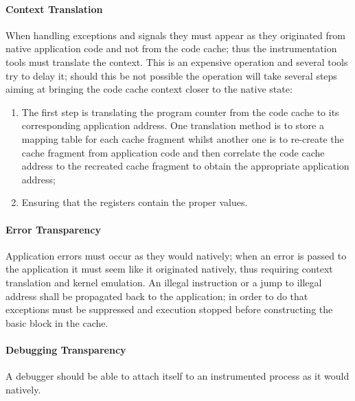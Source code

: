 \paragraph{Context Translation} When handling exceptions and signals they must appear as they originated from native
application code and not from the code cache; thus the instrumentation tools must translate the context. This is an
expensive operation and several tools try to delay it; should this be not possible the operation will take several steps
aiming at bringing the code cache context closer to the native state:
\begin{enumerate}
    \item The first step is translating the program counter from the code cache to its corresponding application
        address. One translation method is to store a mapping table for each cache fragment whilst another one is to
        re-create the cache fragment from application code and then correlate the code cache address to the recreated
        cache fragment to obtain the appropriate application address;
    \item Ensuring that the registers contain the proper values.
\end{enumerate}
\paragraph{Error Transparency} Application errors must occur as they would natively; when an error is passed to the
application it must seem like it originated natively, thus requiring context translation and kernel emulation. An
illegal instruction or a jump to illegal address shall be propagated back to the application; in order to do that
exceptions must be suppressed and execution stopped before constructing the basic block in the cache.
\paragraph{Debugging Transparency} A debugger should be able to attach itself to an instrumented process as it would
natively.

